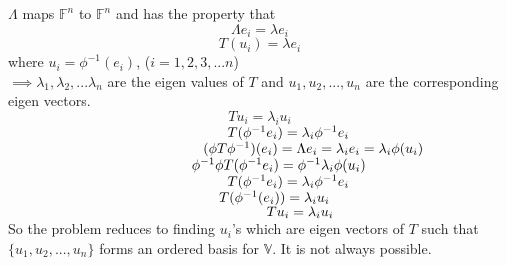 \documentclass[12pt]{article}
\theoremstyle{definition}
\begin{document}
$ \Lambda $ maps $ \mathbb{F}^{n} $ to $ \mathbb{F}^{n} $ and has the property that $$\Lambda e_{i}=\lambda e_{i} $$ $$T( u_{i})=\lambda e_{i} $$ where $ u_{i}=\phi^{-1}(e_{i}) $, ($ i=1,2,3,...n $)\\$ \implies \lambda_{1}, \lambda_{2} ,...\lambda_{n} $ are the eigen values of $ T $ and $ u_{1},u_{2},...,u_{n} $ are the corresponding eigen vectors. \\$$ Tu_{i}=\lambda_{i}u_{i} $$ $ \hspace*{5.5cm} T(\phi^{-1}e_{i})=\lambda_{i}\phi^{-1}e_{i} $\\$ \hspace*{4.9cm} (\phi T \phi^{-1})(e_{i})=\Lambda e_{i}=\lambda_{i}e_{i}=\lambda_{i}\phi(u_{i}) $\\ $ \hspace*{4.6cm} \phi^{-1}\phi T(\phi^{-1}e_{i})=\phi^{-1}\lambda_{i}\phi (u_{i}) $\\$ \hspace*{5.5cm} T(\phi^{-1}e_{i})=\lambda_{i}\phi^{-1}e_{i}
$\\$ \hspace*{5.3cm} T(\phi^{-1}(e_{i}))=\lambda_{i}u_{i} $\\$\hspace*{6.5cm} Tu_{i}=\lambda_{i}u_{i} $\\
So the problem reduces to finding $u_{i}$'s which are eigen vectors of $ T $ such that $ \{u_{1},u_{2},...,u_{n}\} $ forms an ordered basis for $ \mathbb{V} $. It is not always possible.
\begin{center}
\end{center}
\end{document}
